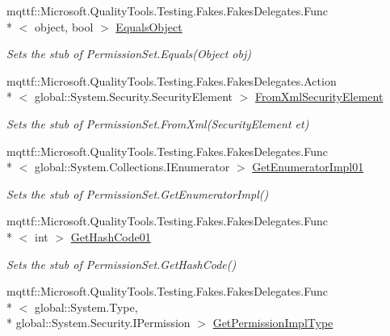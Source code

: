 \begin{DoxyCompactItemize}
mqttf\-::\-Microsoft.\-Quality\-Tools.\-Testing.\-Fakes.\-Fakes\-Delegates.\-Func\\*
$<$ object, bool $>$ \hyperlink{class_system_1_1_security_1_1_fakes_1_1_stub_permission_set_a70ff7df48a5a60b8334fa50ab6ebab73}{Equals\-Object}
\begin{DoxyCompactList}\small\item\em Sets the stub of Permission\-Set.\-Equals(\-Object obj)\end{DoxyCompactList}\item 
mqttf\-::\-Microsoft.\-Quality\-Tools.\-Testing.\-Fakes.\-Fakes\-Delegates.\-Action\\*
$<$ global\-::\-System.\-Security.\-Security\-Element $>$ \hyperlink{class_system_1_1_security_1_1_fakes_1_1_stub_permission_set_a520b06db4fbce1540b4adb78695424e8}{From\-Xml\-Security\-Element}
\begin{DoxyCompactList}\small\item\em Sets the stub of Permission\-Set.\-From\-Xml(\-Security\-Element et)\end{DoxyCompactList}\item 
mqttf\-::\-Microsoft.\-Quality\-Tools.\-Testing.\-Fakes.\-Fakes\-Delegates.\-Func\\*
$<$ global\-::\-System.\-Collections.\-I\-Enumerator $>$ \hyperlink{class_system_1_1_security_1_1_fakes_1_1_stub_permission_set_ac9d4efeb7f60f14c0387a1089b9da46b}{Get\-Enumerator\-Impl01}
\begin{DoxyCompactList}\small\item\em Sets the stub of Permission\-Set.\-Get\-Enumerator\-Impl()\end{DoxyCompactList}\item 
mqttf\-::\-Microsoft.\-Quality\-Tools.\-Testing.\-Fakes.\-Fakes\-Delegates.\-Func\\*
$<$ int $>$ \hyperlink{class_system_1_1_security_1_1_fakes_1_1_stub_permission_set_a9c2f0fec70925b817b46345404053334}{Get\-Hash\-Code01}
\begin{DoxyCompactList}\small\item\em Sets the stub of Permission\-Set.\-Get\-Hash\-Code()\end{DoxyCompactList}\item 
mqttf\-::\-Microsoft.\-Quality\-Tools.\-Testing.\-Fakes.\-Fakes\-Delegates.\-Func\\*
$<$ global\-::\-System.\-Type, \\*
global\-::\-System.\-Security.\-I\-Permission $>$ \hyperlink{class_system_1_1_security_1_1_fakes_1_1_stub_permission_set_a7f6a7fbaf260aecc82d9205c49b0a9bb}{Get\-Permission\-Impl\-Type}

\end{DoxyCompactItemize}
